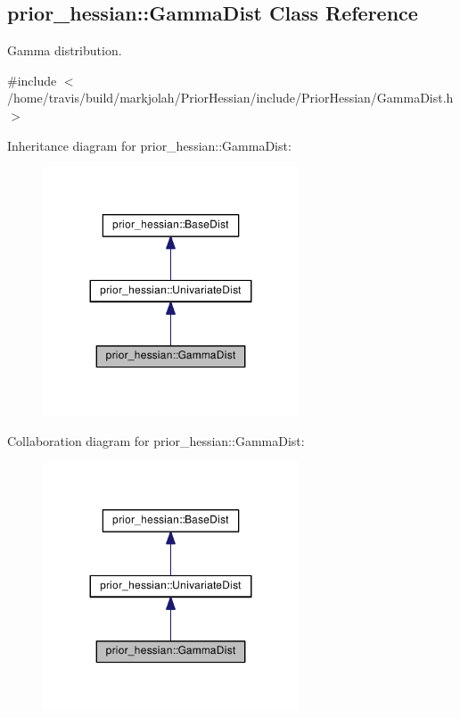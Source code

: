 \hypertarget{classprior__hessian_1_1GammaDist}{}\subsection{prior\+\_\+hessian\+:\+:Gamma\+Dist Class Reference}
\label{classprior__hessian_1_1GammaDist}


Gamma distribution.  




{\ttfamily \#include $<$/home/travis/build/markjolah/\+Prior\+Hessian/include/\+Prior\+Hessian/\+Gamma\+Dist.\+h$>$}



Inheritance diagram for prior\+\_\+hessian\+:\+:Gamma\+Dist\+:\nopagebreak
\begin{figure}[H]
\begin{center}
\leavevmode
\includegraphics[width=215pt]{classprior__hessian_1_1GammaDist__inherit__graph}
\end{center}
\end{figure}


Collaboration diagram for prior\+\_\+hessian\+:\+:Gamma\+Dist\+:\nopagebreak
\begin{figure}[H]
\begin{center}
\leavevmode
\includegraphics[width=215pt]{classprior__hessian_1_1GammaDist__coll__graph}
\end{center}
\end{figure}
